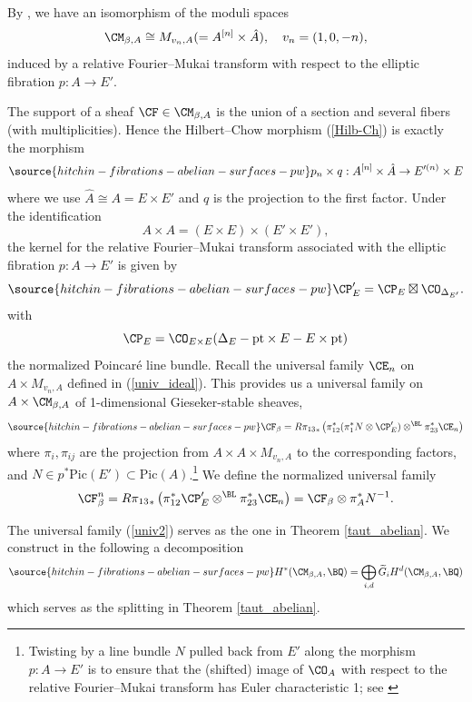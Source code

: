By \cite[Theorem 3.15]{Yo}, we have an isomorphism of the moduli spaces
\[
\CM_{\beta,A} \cong M_{v_n, A}(= A^{[n]} \times \hat{A}),\quad v_n = (1,0,-n),
\]
induced by a relative Fourier--Mukai transform with respect to the elliptic fibration $p: A \to E'$.

The support of a sheaf $\CF \in \CM_{\beta, A}$ is the union of a section and several fibers (with multiplicities). Hence the Hilbert--Chow morphism (\ref{Hilb-Ch}) is exactly the morphism
\begin{equation}\label{HC2}
\source{hitchin-fibrations-abelian-surfaces-pw}
p_n\times q: A^{[n]} \times \hat{A} \to E'^{(n)} \times E
\end{equation}
where we use $\hat{A}\cong A = E \times E'$ and $q$ is the projection to the first factor.  Under the identification
\[
A \times A = (E \times E) \times (E'\times E'),
\]
the kernel for the relative Fourier--Mukai transform associated with the elliptic fibration $p: A \to E'$ is given by
\begin{equation}\label{rel_P}
\source{hitchin-fibrations-abelian-surfaces-pw}
\CP'_E = \CP_E \boxtimes \CO_{\Delta_{E'}}.
\end{equation}
with
\[
\CP_E = \CO_{E\times E}(\Delta_E - \mathrm{pt}\times E - E\times \mathrm{pt})
\]
the normalized Poincar\'e line bundle. Recall the universal family $\CE_n$ on $A \times M_{v_n,A}$ defined in (\ref{univ_ideal}). This provides us a universal family on $A \times \CM_{\beta,A}$ of 1-dimensional Gieseker-stable sheaves,
\begin{equation}\label{univ2}
\source{hitchin-fibrations-abelian-surfaces-pw}
\CF_\beta = {R\pi_{13}}_\ast \left( \pi_{12}^\ast (\pi_1^*N\otimes{\CP'_{E}}) \otimes^{\BL} \pi_{23}^\ast \CE_n \right)
\end{equation}
where $\pi_i, \pi_{ij}$ are the projection from $A \times A \times M_{v_n,A}$ to the corresponding factors, and $N \in p^* \mathrm{Pic}(E')\subset \mathrm{Pic}(A)$.\footnote{Twisting by a line bundle $N$ pulled back from $E'$ along the morphism $p: A \to {E'}$ is to ensure that the (shifted) image of $\CO_A$ with respect to the relative Fourier--Mukai transform has Euler characteristic 1; see \cite[Section 3.2]{Yo}} We define the normalized universal family
\[
\CF^{n}_\beta = {R\pi_{13}}_\ast \left( \pi_{12}^\ast {\CP'_{E}} \otimes^{\BL} \pi_{23}^\ast \CE_n \right) = \CF_\beta \otimes \pi_A^\ast N^{-1}.
\]

The universal family (\ref{univ2}) serves as the one in Theorem \ref{taut_abelian}. We construct in the following a decomposition
\begin{equation}\label{splitting1}
\source{hitchin-fibrations-abelian-surfaces-pw}
H^\ast(\CM_{\beta, A}, \BQ) = \bigoplus_{i,d} \widetilde{G}_iH^d(\CM_{\beta, A}, \BQ)
\end{equation}
which serves as the splitting in Theorem \ref{taut_abelian}.

